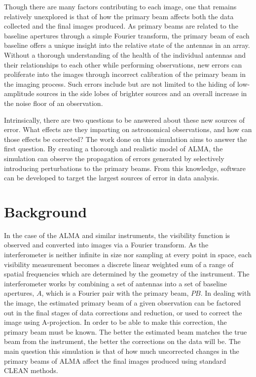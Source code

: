 \documentclass[11pt]{article}
\begin{document}
Though there are many factors contributing to each image, one that remains 
relatively unexplored is that of how the primary beam affects both the data 
collected and the final images produced. As primary beams are related to the 
baseline apertures through a simple Fourier transform, the primary beam of each 
baseline offers a unique insight into the relative state of the antennas in an 
array. Without a thorough understanding of the health of the individual 
antennas and their relationships to each other while performing observations, 
new errors can proliferate into the images through incorrect calibration of the 
primary beam in the imaging process. Such errors include but are not limited to 
the hiding of low-amplitude sources in the side lobes of brighter sources and 
an overall increase in the noise floor of an observation.

Intrinsically, there are two questions to be answered about these new sources 
of error. What effects are they imparting on astronomical observations, and how 
can those effects be corrected? The work done on this simulation aims to answer 
the first question. By creating a thorough and realistic model of ALMA, the 
simulation can observe the propagation of errors generated by selectively 
introducing perturbations to the primary beams. From this knowledge, software 
can be developed to target the largest sources of error in data analysis.

\section{Background}

In the case of the ALMA and similar instruments, the visibility function is 
observed and converted into images
via a Fourier transform. As the interferometer is neither infinite in size nor 
sampling at every point in space, each visibility measurement becomes a 
discrete linear weighted sum of a range of spatial frequencies which are 
determined by the geometry of the instrument. The interferometer works by 
combining a set of
antennas into a set of baseline apertures, $A$, which is a Fourier pair with
the primary beam, $PB$. In dealing with the image, the estimated
primary beam of a given observation can be factored out in the final stages of
data corrections and reduction, or used to correct the image using 
A-projection.  In order to be able to make this correction, the primary beam 
must be known.
The better the estimated beam matches the true beam from the instrument,
the better the corrections on the data will be. The main question this 
simulation is that of how much uncorrected changes in the primary beams of ALMA 
affect the final images produced using standard CLEAN methods.
\end{document}
